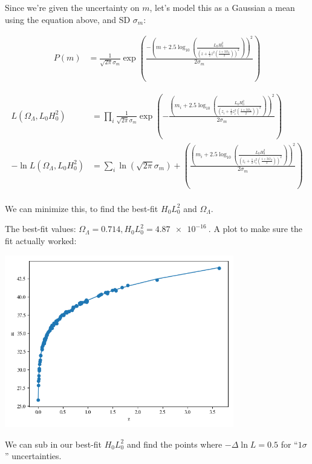 \begin{enumerate}[label=\textbf{\Alph*}.]
    Since we're given the uncertainty on $m$, let's model this as a Gaussian a mean using the equation above, and SD $\sigma_m$:

    \begin{align*}
        P(m) &= \frac{1}{\sqrt{2\pi}\sigma_m} \exp\left(\frac{-\left(m + 2.5\log_{10}\left(\frac{L_0H_0^2}{\left(z + \frac{1}{2}z^2 (\frac{1 +3 \Omega_\Lambda}{2})\right)^2}\right)\right)^2}{2\sigma_m}\right)
    \end{align*}
    
    \begin{align*}
        L(\Omega_\Lambda, L_0H_0^2) &= \prod_i \frac{1}{\sqrt{2\pi}\sigma_m} \exp\left(-\frac{\left(m_i + 2.5\log_{10}\left(\frac{L_0H_0^2}{\left(z_i + \frac{1}{2}z_i^2 (\frac{1 +3 \Omega_\Lambda}{2})\right)^2}\right)\right)^2}{2\sigma_m}\right) \\
        -\ln L(\Omega_\Lambda, L_0H_0^2) &= \sum_i \ln(\sqrt{2\pi}\sigma_m) + \left(\frac{\left(m_i + 2.5\log_{10}\left(\frac{L_0H_0^2}{\left(z_i + \frac{1}{2}z_i^2 (\frac{1 +3 \Omega_\Lambda}{2})\right)^2}\right)\right)^2}{2\sigma_m}\right) \\
    \end{align*}

    We can minimize this, to find the best-fit $H_0L_0^2$ and $\Omega_\Lambda$.

    The best-fit values: $\Omega_\Lambda = 0.714, H_0L_0^2 = \SI{4.87e-16}{}$. A plot to make sure the fit actually worked:

    \begin{center}
        \includegraphics[width=0.75\textwidth]{q3_a_fit.png}
    \end{center}

    We can sub in our best-fit $H_0L_0^2$ and find the points where $-\Delta \ln L = 0.5$ for ``$1\sigma$'' uncertainties.


\end{enumerate}
